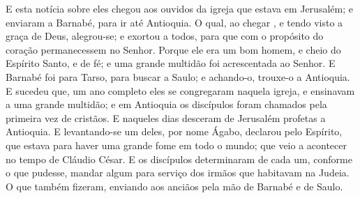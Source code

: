 {  E esta notícia sobre eles chegou aos ouvidos da igreja que estava em Jerusalém; e enviaram a Barnabé, para ir até Antioquia.
  O qual, ao chegar
{}, e tendo visto a graça de Deus, alegrou-se; e exortou a todos, para que com o propósito do coração permanecessem no Senhor.
  Porque ele era um bom homem, e cheio do Espírito Santo, e de fé; e uma grande multidão foi acrescentada ao Senhor.
  E Barnabé foi para Tarso, para buscar a Saulo; e achando-o, trouxe-o a Antioquia.
  E sucedeu que,
{} um ano completo eles se congregaram naquela igreja, e ensinavam a uma grande multidão; e em Antioquia os discípulos foram chamados pela primeira vez de cristãos.
  E naqueles dias desceram de Jerusalém
{} profetas a Antioquia.
  E levantando-se um deles, por nome Ágabo, declarou pelo Espírito, que estava para haver uma grande fome em todo o mundo; que veio a acontecer no tempo de Cláudio César.
  E os discípulos determinaram de cada um, conforme o que pudesse, mandar algum
{} para serviço dos irmãos que habitavam na Judeia.
  O que também fizeram, enviando
{} aos anciãos
 pela mão de Barnabé e de Saulo.
\par }

